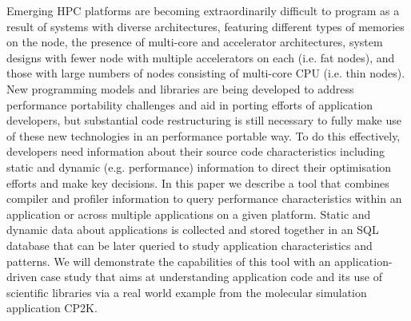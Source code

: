 Emerging HPC platforms are becoming extraordinarily difficult to program as a result of systems with diverse architectures, featuring different types of memories on the node, the presence of multi-core and accelerator architectures, system designs with fewer node with multiple accelerators on each (i.e. fat nodes), and those with large numbers of nodes consisting of multi-core \acs{CPU} (i.e. thin nodes).
New programming models and libraries are being developed to address performance portability challenges and aid in porting efforts of application developers, but substantial code restructuring is still necessary to fully make use of these new technologies in an performance portable way.
To do this effectively, developers need information about their source code characteristics including static and dynamic (e.g. performance) information to direct their optimisation efforts and make key decisions.
In this paper we describe a tool that combines compiler and profiler information to query performance characteristics within an application or across multiple applications on a given platform.
Static and dynamic data about applications is collected and stored together in an \acs{SQL} database that can be later queried to study application characteristics and patterns.
We will demonstrate the capabilities of this tool with an application-driven case study that aims at understanding application code and its use of scientific libraries via a real world example from the molecular simulation application CP2K.
